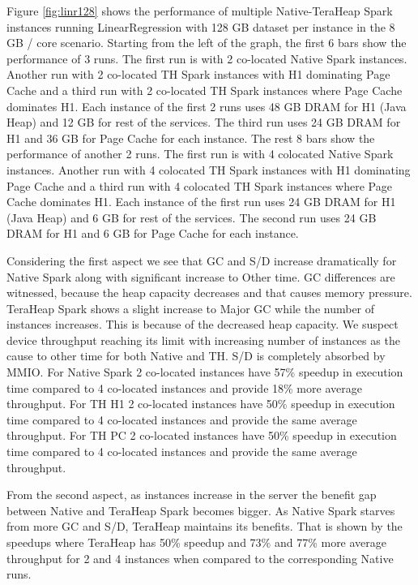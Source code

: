 Figure \ref{fig:linr128} shows the performance of multiple
Native-TeraHeap Spark instances running LinearRegression with 128 GB
dataset per instance in the 8 GB / core scenario.
Starting from the left of the graph, the first 6 bars show the
performance of 3 runs. The first run is with 2 co-located Native Spark instances.
Another run with 2 co-located TH Spark instances with H1 dominating Page Cache
and a third run with 2 co-located TH Spark instances where Page Cache dominates H1.
Each instance of the first 2 runs uses 48 GB DRAM for H1 (Java Heap) and 12 GB for rest of the services.
The third run uses 24 GB DRAM for H1 and 36 GB for Page Cache for each instance.
The rest 8 bars show the performance of another 2 runs. The first run is with 4 colocated Native Spark instances.
Another run with 4 colocated TH Spark instances with H1 dominating Page Cache
and a third run with 4 colocated TH Spark instances where Page Cache dominates H1.
Each instance of the first run uses 24 GB DRAM for H1 (Java Heap) and 6 GB for rest of the services.
The second run uses 24 GB DRAM for H1 and 6 GB for Page Cache for each instance.

Considering the first aspect we see that GC and S/D increase dramatically for Native Spark along with significant increase to Other time. GC differences are witnessed, because the heap capacity decreases and that causes memory pressure. TeraHeap Spark shows a slight increase to Major GC while the number of instances increases. This is because of the decreased heap capacity. We suspect device throughput reaching its limit with increasing number of instances as the cause to other time for both Native and TH. S/D is completely absorbed by MMIO. For Native Spark 2 co-located instances have 57\% speedup in execution time compared to 4 co-located instances and provide 18\% more average throughput. For TH H1 2 co-located instances have 50\% speedup in execution time compared to 4 co-located instances and provide the same average throughput. For TH PC 2 co-located instances have 50\% speedup in execution time compared to 4 co-located instances and provide the same average throughput. 

From the second aspect, as instances increase in the server the benefit gap between Native and TeraHeap Spark becomes bigger. As Native Spark starves from more GC and S/D, TeraHeap maintains its benefits. That is shown by the speedups where TeraHeap has 50\% speedup and 73\% and 77\% more average throughput for 2 and 4 instances when compared to the corresponding Native runs.

